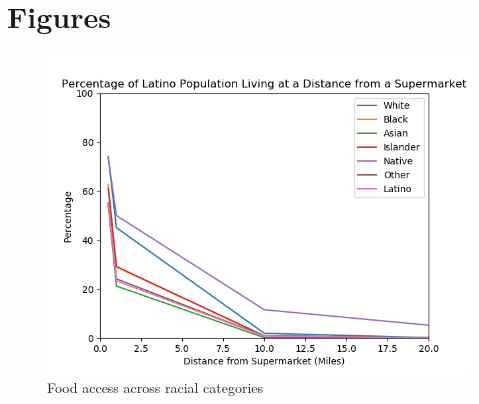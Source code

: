 \documentclass[letterpaper]{article} %
\begin{document}
\newpage
\section{Figures}

\begin{figure}[h] 
	\caption{Food access across racial categories \label{fig:race}}
	\centering
	\includegraphics[width=.6\paperwidth]{Figure_1.png}
\end{figure}
\end{document}
